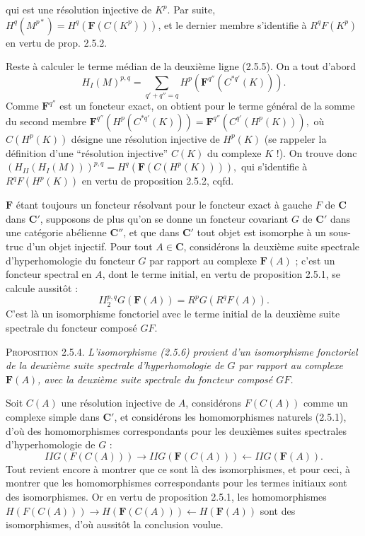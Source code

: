 
\noindent qui est une résolution injective de $K^p$. Par suite,
$H^q(M^{p*})=H^q(\mathbf F(C(K^p)))$, et le dernier membre s'identifie à
$R^qF(K^p)$ en vertu de prop. 2.5.2.

Reste à calculer le terme médian de la deuxième ligne (2.5.5). On a tout
d'abord
\[
H_I(M)^{p,q}
=\sum_{q'+q''=q}H^p(\mathbf F^{q''}(C^{*q'}(K))).
\]
Comme $\mathbf F^{q''}$ est un foncteur exact, on obtient pour le terme
général de la somme du second membre
$\mathbf F^{q''}(H^p(C^{*q'}(K)))
=\mathbf F^{q''}(C^{q'}(H^p(K))),$
où $C(H^p(K))$ désigne une résolution injective de $H^p(K)$ (se rappeler la
définition d'une ``résolution injective'' $C(K)$ du complexe $K$ !). On
trouve donc
$(H_{II}(H_I(M)))^{p,q}
=H^q(\mathbf F(C(H^p(K)))),$
qui s'identifie à $R^qF(H^p(K))$ en vertu de proposition 2.5.2, cqfd.

$\mathbf F$ étant toujours un foncteur résolvant pour le foncteur exact à
gauche $F$ de $\mathbf C$ dans $\mathbf C'$, supposons de plus qu'on se donne un foncteur
covariant $G$ de $\mathbf C'$ dans une catégorie abélienne $\mathbf C''$, et que dans $\mathbf C'$
tout objet est isomorphe à un sous-truc d'un objet injectif. Pour tout
$A\in \mathbf C$, considérons la deuxième suite spectrale d'hyperhomologie du
foncteur $G$ par rapport au complexe $\mathbf F(A)$ ; c'est un foncteur
spectral en $A$, dont le terme initial, en vertu de proposition 2.5.1, se
calcule aussitôt :
\[
\tag{2.5.6}
II_2^{p,q}G(\mathbf F(A))=R^pG(R^qF(A)).
\]
C'est là un isomorphisme fonctoriel avec le terme initial de la deuxième suite
spectrale du foncteur composé $GF$.

\textsc{Proposition 2.5.4.} \textit{L'isomorphisme \textup{(2.5.6)}
provient d'un isomorphisme fonctoriel de la deuxième suite spectrale
d'hyperhomologie de $G$ par rapport au complexe $\mathbf F(A)$, avec la
deuxième suite spectrale du foncteur composé $GF$.}

Soit $C(A)$ une résolution injective de $A$, considérons $F(C(A))$ comme un
complexe simple dans $\mathbf C'$, et considérons les homomorphismes naturels (2.5.1),
d'où des homomorphismes correspondants pour les deuxièmes suites spectrales
d'hyperhomologie de $G$ :
\[
IIG(F(C(A)))\to IIG(\mathbf F(C(A)))
\leftarrow IIG(\mathbf F(A)).
\]
Tout revient encore à montrer que ce sont là des isomorphismes, et pour ceci,
à montrer que les homomorphismes correspondants pour les termes initiaux sont
des isomorphismes. Or en vertu de proposition 2.5.1, les homomorphismes
$H(F(C(A)))\to H(\mathbf F(C(A)))\leftarrow H(\mathbf F(A))$
sont des isomorphismes, d'où aussitôt la conclusion voulue.

